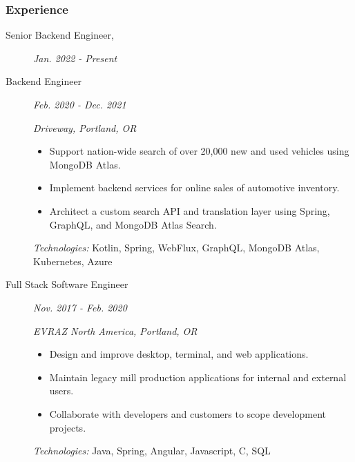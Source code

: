 \documentclass{article}
\begin{document}

\subsubsection*{Experience}

    \begin{description}
		
	\item[Senior Backend Engineer,] \hfill \textit{Jan. 2022 - Present}
	\item[Backend Engineer] \hfill \textit{Feb. 2020 - Dec. 2021}
		
        \textit{Driveway, Portland, OR}
        \begin{itemize}
        \item Support nation-wide search of over 20,000 new and used vehicles using MongoDB Atlas.
        \item Implement backend services for online sales of automotive inventory.
        \item Architect a custom search API and translation layer using Spring, GraphQL, and MongoDB Atlas Search.
          
        \end{itemize}
        \textit{Technologies:} Kotlin, Spring, WebFlux, GraphQL, MongoDB Atlas, Kubernetes, Azure
		\vspace{0.5em}

	\item[Full Stack Software Engineer] \hfill \textit{Nov. 2017 - Feb. 2020}
		
        \textit{EVRAZ North America, Portland, OR}
        \begin{itemize}     
            \item Design and improve desktop, terminal, and web applications.
            \item Maintain legacy mill production applications for internal and external users.
            \item Collaborate with developers and customers to scope development projects.
        \end{itemize}
        \textit{Technologies:} Java, Spring, Angular, Javascript, C, SQL
        
    \end{description}
\end{document}

